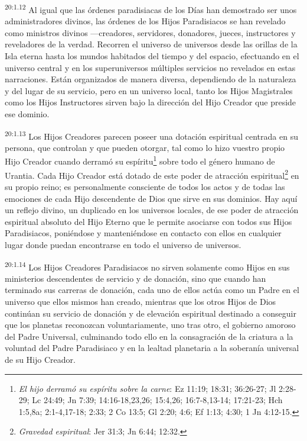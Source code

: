 \par
\textsuperscript{20:1.12} Al igual que las órdenes paradisiacas de los Días han demostrado ser unos administradores divinos, las órdenes de los Hijos Paradisiacos se han revelado como ministros divinos ---creadores, servidores, donadores, jueces, instructores y reveladores de la verdad. Recorren el universo de universos desde las orillas de la Isla eterna hasta los mundos habitados del tiempo y del espacio, efectuando en el universo central y en los superuniversos múltiples servicios no revelados en estas narraciones. Están organizados de manera diversa, dependiendo de la naturaleza y del lugar de su servicio, pero en un universo local, tanto los Hijos Magistrales como los Hijos Instructores sirven bajo la dirección del Hijo Creador que preside ese dominio.

\par
\textsuperscript{20:1.13} Los Hijos Creadores parecen poseer una dotación espiritual centrada en su persona, que controlan y que pueden otorgar, tal como lo hizo vuestro propio Hijo Creador cuando derramó su espíritu\footnote{\textit{El hijo derramó su espíritu sobre la carne}: Ez 11:19; 18:31; 36:26-27; Jl 2:28-29; Lc 24:49; Jn 7:39; 14:16-18,23,26; 15:4,26; 16:7-8,13-14; 17:21-23; Hch 1:5,8a; 2:1-4,17-18; 2:33; 2 Co 13:5; Gl 2:20; 4:6; Ef 1:13; 4:30; 1 Jn 4:12-15.} sobre todo el género humano de Urantia. Cada Hijo Creador está dotado de este poder de atracción espiritual\footnote{\textit{Gravedad espiritual}: Jer 31:3; Jn 6:44; 12:32.} en su propio reino; es personalmente consciente de todos los actos y de todas las emociones de cada Hijo descendente de Dios que sirve en sus dominios. Hay aquí un reflejo divino, un duplicado en los universos locales, de ese poder de atracción espiritual absoluto del Hijo Eterno que le permite asociarse con todos sus Hijos Paradisiacos, poniéndose y manteniéndose en contacto con ellos en cualquier lugar donde puedan encontrarse en todo el universo de universos.

\par
\textsuperscript{20:1.14} Los Hijos Creadores Paradisiacos no sirven solamente como Hijos en sus ministerios descendentes de servicio y de donación, sino que cuando han terminado sus carreras de donación, cada uno de ellos actúa como un Padre en el universo que ellos mismos han creado, mientras que los otros Hijos de Dios continúan su servicio de donación y de elevación espiritual destinado a conseguir que los planetas reconozcan voluntariamente, uno tras otro, el gobierno amoroso del Padre Universal, culminando todo ello en la consagración de la criatura a la voluntad del Padre Paradisiaco y en la lealtad planetaria a la soberanía universal de su Hijo Creador.


